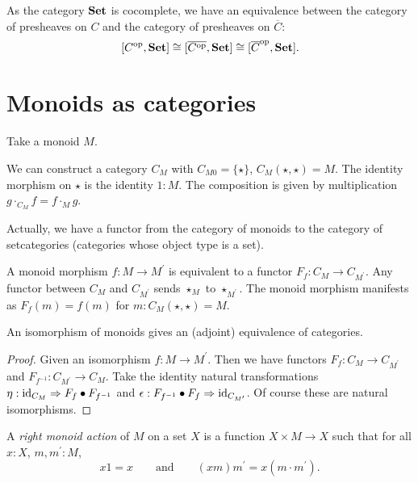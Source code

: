 \begin{corollary}
  As the category $ \mathbf{Set} $ is cocomplete, we have an equivalence between the category of presheaves on $ C $ and the category of presheaves on $ \overline C $:
  \[ [C^{\text{op}}, \mathbf{Set}] \cong [\overline{C^{\text{op}}}, \mathbf{Set}] \cong [\overline C^{\text{op}}, \mathbf{Set}]. \]
\end{corollary}

\section{Monoids as categories}\label{sec:monoid-category}
Take a monoid $ M $.
\begin{definition}
  We can construct a category $ C_M $ with $ C_{M0} = \{ \star \} $, $ C_M(\star, \star) = M $. The identity morphism on $ \star $ is the identity $ 1: M $. The composition is given by multiplication $ g \cdot_{C_M} f = f \cdot_M g $.
\end{definition}

\begin{remark}
  Actually, we have a functor from the category of monoids to the category of setcategories (categories whose object type is a set).

  A monoid morphism $ f: M \to M^\prime $ is equivalent to a functor $ F_f: C_M \to C_{M^\prime} $. Any functor between $ C_M $ and $ C_{M^\prime} $ sends $ \star_M $ to $ \star_{M^\prime} $. The monoid morphism manifests as $ F_f(m) = f(m) $ for $ m: C_M(\star, \star) = M $.
\end{remark}

\begin{lemma}
  An isomorphism of monoids gives an (adjoint) equivalence of categories.
\end{lemma}
\begin{proof}
  Given an isomorphism $ f: M \to M^\prime $. Then we have functors $ F_f: C_M \to C_{M^\prime} $ and $ F_{f^{-1}}: C_{M^\prime} \to C_M $. Take the identity natural transformations $ \eta: \text{id}_{C_M} \Rightarrow F_f \bullet F_{f^{-1}} $ and $ \epsilon: F_{f^{-1}} \bullet F_f \Rightarrow \text{id}_{C_{M^\prime}} $. Of course these are natural isomorphisms.
\end{proof}

\begin{definition}
  A \textit{right monoid action} of $ M $ on a set $ X $ is a function $ X \times M \to X $ such that for all $ x: X $, $ m, m^\prime: M $,
  \[ x 1 = x \qquad \text{and} \qquad (x m) m^\prime = x (m \cdot m^\prime). \]
\end{definition}

